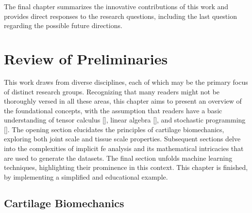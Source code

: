 The final chapter summarizes the innovative contributions of this work and provides direct responses to the research questions, including the last question regarding the possible future directions.

\chapter{Review of Preliminaries}\label{ch2}
This work draws from diverse disciplines, each of which may be the primary focus of distinct research groups. Recognizing that many readers might not be thoroughly versed in all these areas, this chapter aims to present an overview of the foundational concepts, with the assumption that readers have a basic understanding of tensor calculus [\cite{fleisch2011}], linear algebra [\cite{strang2023}], and stochastic programming [\cite{birge2011}]. The opening section elucidates the principles of cartilage biomechanics, exploring both joint scale and tissue scale properties. Subsequent sections delve into the complexities of implicit \ac{fe} analysis and its mathematical intricacies that are used to generate the datasets. The final section unfolds machine learning techniques, highlighting their prominence in this context. This chapter is finished, by implementing a simplified and educational example.

\section{Cartilage Biomechanics}

